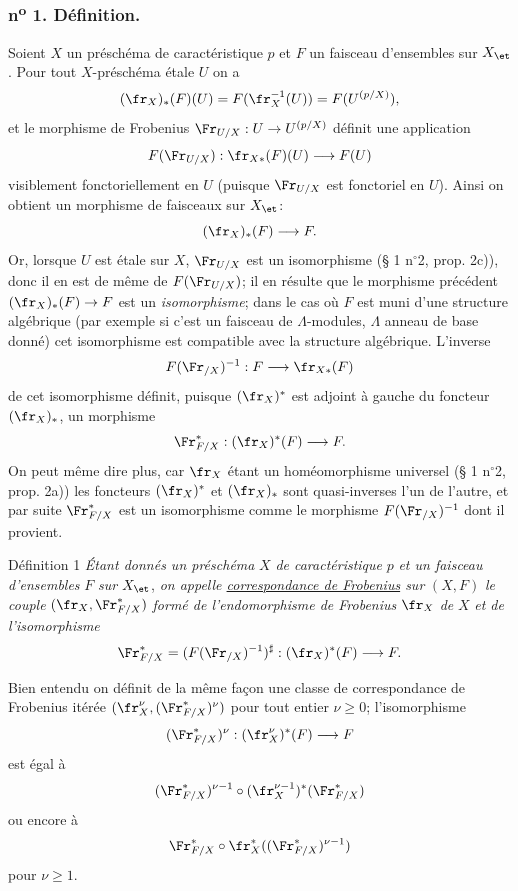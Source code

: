 \subsubsection*{n\textsuperscript{o} 1. Définition.}

Soient $X$ un préschéma de caractéristique $p$ et $F$ un faisceau d'ensembles sur $X_{\et}$. Pour tout $X$-préschéma étale $U$ on a
\[
(\fr_X)_*(F)(U)=F(\fr_X^{-1}(U))=F(U^{(p/X)}),
\]
et le morphisme de Frobenius $\Fr_{U/X}:U\to U^{(p/X)}$ définit une application
\[
F(\Fr_{U/X}):\fr_{X*}(F)(U)\longrightarrow F(U)
\]
visiblement fonctoriellement en $U$ (puisque $\Fr_{U/X}$ est fonctoriel en $U$). Ainsi on obtient un morphisme de faisceaux sur $X_{\et}$:
\[
(\fr_X)_*(F)\longrightarrow F.
\]
Or, lorsque $U$ est étale sur $X$, $\Fr_{U/X}$ est un isomorphisme (§ 1 n$^\circ$2, prop. 2c)), donc il en est de même de $F(\Fr_{U/X})$; il en résulte que le morphisme précédent $(\fr_X)_*(F)\to F$ est un \emph{isomorphisme}; dans le cas où $F$ est muni d'une structure algébrique (par exemple si c'est un faisceau de $\Lambda$-modules, $\Lambda$ anneau de base donné) cet isomorphisme est compatible avec la structure algébrique. L'inverse
\[
F(\Fr_{/X})^{-1}:F\longrightarrow \fr_{X*}(F)
\]
de cet isomorphisme définit, puisque 
$(\fr_X)^*$ est
adjoint à gauche du foncteur $(\fr_X)_*$, un morphisme
\[
\Fr^*_{F/X}:(\fr_X)^*(F)\longrightarrow F.
\]
On peut même dire plus, car $\fr_X$ étant un homéomorphisme universel (§ 1 n$^\circ$2, prop. 2a)) les foncteurs $(\fr_X)^*$ et $(\fr_X)_*$ sont quasi-inverses l'un de l'autre, et par suite $\Fr^*_{F/X}$ est un isomorphisme comme le morphisme $F(\Fr_{/X})^{-1}$ dont il provient.

\begin{statement}{Définition 1}
\emph{Étant donnés un préschéma} $X$ \emph{de caractéristique} $p$ \emph{et un faisceau d'ensembles} $F$ \emph{sur} $X_{\et}$, \emph{on appelle \underline{correspondance de Frobenius} sur} $(X,F)$ \emph{le couple} $(\fr_X,\Fr^*_{F/X})$ \emph{formé de l'endomorphisme de Frobenius} $\fr_X$ \emph{de} $X$ \emph{et de l'isomorphisme}
\[
\Fr^*_{F/X}=(F(\Fr_{/X})^{-1})^\sharp:(\fr_X)^*(F)\longrightarrow F.
\]
\end{statement}

Bien entendu on définit de la même façon une classe de correspondance de Frobenius itérée $(\fr_X^\nu,(\Fr^*_{F/X})^\nu)$ pour tout entier $\nu\geq0$; l'isomorphisme
\[
(\Fr^*_{F/X})^\nu:(\fr_X^\nu)^*(F)\longrightarrow F
\]
est égal à
\[
(\Fr^*_{F/X})^{\nu-1}\circ (\fr_X^{\nu-1})^*(\Fr^*_{F/X})
\]
ou encore à
\[
\Fr^*_{F/X}\circ\fr_X^*((\Fr^*_{F/X})^{\nu-1})
\]
pour $\nu\geq1$.

